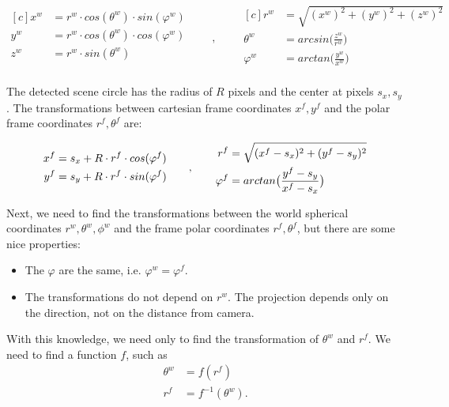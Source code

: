 \documentclass[a4paper,12pt,titlepage, twoside]{article}
\numberwithin{figure}{section}
\begin{document}
\begin{equation*}
\begin{aligned}[c]
x^w &= r^w \cdot cos(\theta^w) \cdot sin(\varphi^w) \\
y^w &= r^w \cdot cos(\theta^w) \cdot cos(\varphi^w) \\
z^w &= r^w \cdot sin(\theta^w) \\
\end{aligned}
\qquad,\qquad
\begin{aligned}[c]
r^w &= \sqrt{(x^w)^2 + (y^w)^2 + (z^w)^2} \\
\theta^w &= arcsin\Big(\frac{z^w}{r^w}\Big) \\
\varphi^w &= arctan\Big(\frac{y^w}{x^w}\Big) \\
\end{aligned}
\end{equation*}



The detected scene circle has the radius of $R$ pixels and the center at pixels $s_x, s_y$. The transformations between cartesian frame coordinates $x^f, y^f$ and the polar frame coordinates $r^f, \theta^f$ are:

\begin{equation*}
\begin{aligned}[c]
x^f &= s_x + R \cdot r^f \cdot cos(\varphi^f) \\
y^f &= s_y + R \cdot r^f \cdot sin(\varphi^f) \\
\end{aligned}
\qquad,\qquad
\begin{aligned}[c]
r^f &= \sqrt{(x^f - s_x)^2 + (y^f - s_y)^2} \\
\varphi^f &= arctan\big{(}\frac{y^f - s_y}{x^f - s_x}\big{)}
\end{aligned}
\end{equation*}

Next, we need to find the transformations between the world spherical coordinates $r^w, \theta^w, \phi^w$ and the frame polar coordinates $r^f, \theta^f$, but there are some nice properties:

\begin{itemize}
\item The $\varphi$ are the same, i.e. $\varphi^w = \varphi^f$.
\item The transformations do not depend on $r^w$. The projection depends only on the direction, not on the distance from camera.
\end{itemize}

With this knowledge, we need only to find the transformation of $\theta^w$ and $r^f$. We need to find a function $f$, such as 
\begin{equation}
\begin{aligned}
\theta^w &= f(r^f) \\
r^f &= f^{-1}(\theta^w). \\
\end{aligned}
\end{equation}
\end{document}
